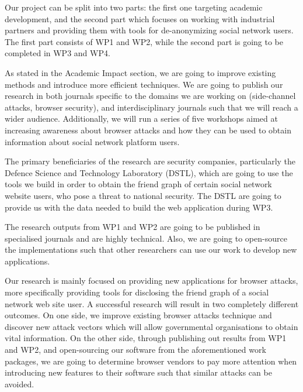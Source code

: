 \documentclass[a4paper,11pt]{article}
\begin{document}
%
Our project can be split into two parts: the first one targeting academic development, and the second part which focuses on working with industrial partners and providing them with tools for de-anonymizing social network users. The first part consists of WP1 and WP2, while the second part is going to be completed in WP3 and WP4.

As stated in the Academic Impact section, we are going to improve existing methods and introduce more efficient techniques. We are going to publish our research in both journals specific to the domains we are working on (side-channel attacks, browser security), and interdisciplinary journals such that we will reach a wider audience. Additionally, we will run a series of five workshops aimed at increasing awareness about browser attacks and how they can be used to obtain information about social network platform users.

The primary beneficiaries of the research are security companies, particularly the Defence Science and Technology Laboratory (DSTL), which are going to use the tools we build in order to obtain the friend graph of certain social network website users, who pose a threat to national security. The DSTL are going to provide us with the data needed to build the web application during WP3.

The research outputs from WP1 and WP2 are going to be published in specialised journals and are highly technical. Also, we are going to open-source the implementations such that other researchers can use our work to develop new applications.

Our research is mainly focused on providing new applications for browser attacks, more specifically providing tools for disclosing the friend graph of a social network web site user. A successful research will result in two completely different outcomes. On one side, we improve existing browser attacks technique and discover new attack vectors which will allow governmental organisations to obtain vital information. On the other side, through publishing out results from WP1 and WP2, and open-sourcing our software from the aforementioned work packages, we are going to determine browser vendors to pay more attention when introducing new features to their software such that similar attacks can be avoided.
\end{document}
